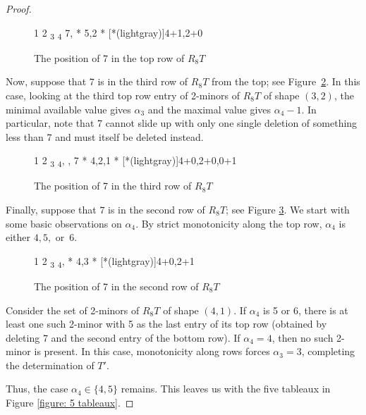 \documentclass[12pt]{amsart}
\theoremstyle{definition}
\theoremstyle{remark}
\numberwithin{equation}{section}
\numberwithin{figure}{section}
\begin{document}
\begin{proof}
 	\begin{figure}[H]
		\centering
    \ytableaushort
        {1 2 {\alpha\textsubscript{3}} {\alpha\textsubscript{4}} 7,
        \none}
        * {5,2}
        * [*(lightgray)]{4+1,2+0}
		\caption{The position of 7 in the top row of $R_8 T$}
		\label{figure: 7 in T part 1}
	\end{figure}

	Now, suppose that $7$ is in the third row of $R_8T$ from the top; see Figure~\ref{figure: 7 in T part 2}. In this case, looking at the third top row entry of 2-minors of $R_8T$ of shape $(3,2)$, the minimal available value gives $\alpha_3$ and the maximal value gives $\alpha_4 -1$. In particular, note that 7 cannot slide up with only one single deletion of something less than 7 and must itself be deleted instead.

   	\begin{figure}[H]
		\centering
    \ytableaushort
        {1 2 {\alpha\textsubscript{3}} {\alpha\textsubscript{4}}, \none,
        7}
        * {4,2,1}
        * [*(lightgray)]{4+0,2+0,0+1}
		\caption{The position of 7 in the third row of $R_8 T$}
		\label{figure: 7 in T part 2}
	\end{figure}
	
	Finally, suppose that $7$ is in the second row of $R_8T$; see Figure \ref{figure: 7 in T part 3}. We start with some basic observations on $\alpha_4$. By strict monotonicity along the top row, $\alpha_4$ is either $4,5,$ or~6.

    \begin{figure}[H]
		\centering
    \ytableaushort
        {1 2 {\alpha\textsubscript{3}} {\alpha\textsubscript{4}},
        \none{}}
        * {4,3}
        * [*(lightgray)]{4+0,2+1}
		\caption{The position of 7 in the second row of $R_8 T$}
		\label{figure: 7 in T part 3}
	\end{figure}

	 Consider the set of 2-minors of $R_8T$ of shape $(4,1)$. If $\alpha_4$ is 5 or 6, there is at least one such 2-minor with 5 as the last entry of its top row (obtained by deleting 7 and the second entry of the bottom row). If $\alpha_4=4$, then no such 2-minor is present. In this case, monotonicity along rows forces $\alpha_3=3$, completing the determination of $T'$.

  Thus, the case $\alpha_4 \in \{4,5\}$ remains. This leaves us with the five tableaux in Figure \ref{figure: 5 tableaux}.



\end{proof}
\end{document}
